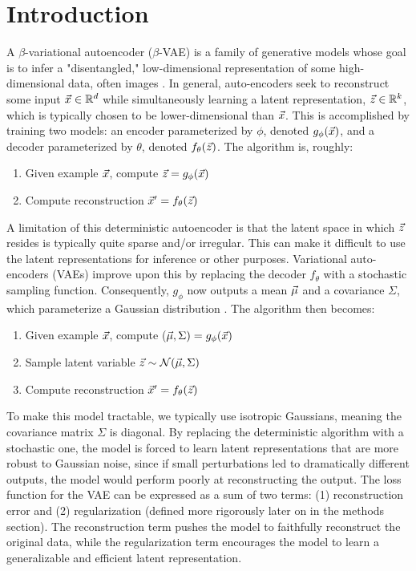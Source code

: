 \section{Introduction}

A $\beta$-variational autoencoder ($\beta$-VAE) is a family of generative models whose goal is to infer a "disentangled," low-dimensional representation of some high-dimensional data, often images \cite{weng2018VAE}. In general, auto-encoders seek to reconstruct some input $\vec{x}\in\mathbb{R}^d$ while simultaneously learning a latent representation, $\vec{z}\in\mathbb{R}^k$, which is typically chosen to be lower-dimensional than $\vec{x}$. This is accomplished by training two models: an encoder parameterized by $\phi$, denoted $g_\phi(\vec{x})$, and a decoder parameterized by $\theta$, denoted $f_\theta(\vec{z})$. The algorithm is, roughly:
\begin{enumerate}
    \item Given example $\vec{x}$, compute $\vec{z} = g_\phi(\vec{x})$
    \item Compute reconstruction $\vec{x}' = f_\theta(\vec{z})$
\end{enumerate}
A limitation of this deterministic autoencoder is that the latent space in which $\vec{z}$ resides is typically quite sparse and/or irregular. This can make it difficult to use the latent representations for inference or other purposes. Variational auto-encoders (VAEs) improve upon this by replacing the decoder $f_\theta$ with a stochastic sampling function. Consequently, $g_\phi$ now outputs a mean $\vec{\mu}$ and a covariance $\Sigma$, which parameterize a Gaussian distribution \cite{kingma2013auto}. The algorithm then becomes:
\begin{enumerate}
    \item Given example $\vec{x}$, compute ($\vec{\mu}, \Sigma) = g_\phi(\vec{x})$
    \item Sample latent variable $\vec{z} \sim \mathcal{N}(\vec{\mu}, \Sigma)$
    \item Compute reconstruction $\vec{x}' = f_\theta(\vec{z})$
\end{enumerate}

To make this model tractable, we typically use isotropic Gaussians, meaning the covariance matrix $\Sigma$ is diagonal. By replacing the deterministic algorithm with a stochastic one, the model is forced to learn latent representations that are more robust to Gaussian noise, since if small perturbations led to dramatically different outputs, the model would perform poorly at reconstructing the output. The loss function for the VAE can be expressed as a sum of two terms: (1) reconstruction error and (2) regularization (defined more rigorously later on in the methods section). The reconstruction term pushes the model to faithfully reconstruct the original data, while the regularization term encourages the model to learn a generalizable and efficient latent representation.

